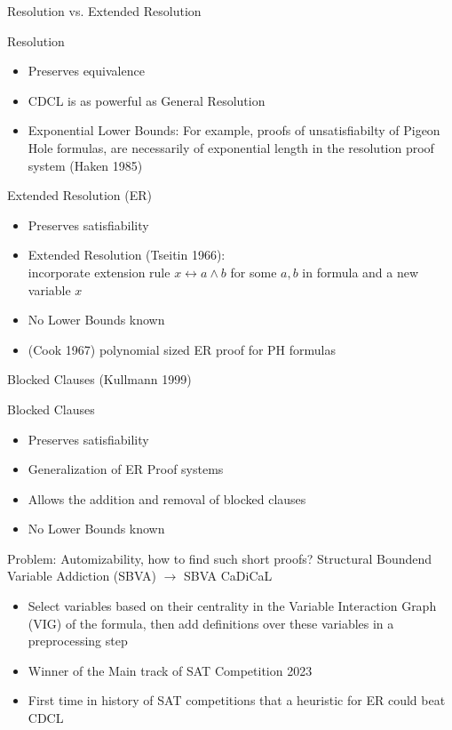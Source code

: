 \documentclass[t]{sdqbeamer}
\begin{document}
\begin{frame}{Resolution vs. Extended Resolution}
\begin{block}{Resolution}
\begin{itemize}\setlength{\itemsep}{1ex}
    \item Preserves equivalence
    \item CDCL is as powerful as General Resolution
    \item Exponential Lower Bounds: For example, proofs of unsatisfiabilty of Pigeon Hole formulas, are necessarily of exponential length in the resolution proof system (Haken 1985)
\end{itemize}
\end{block}
\begin{block}{Extended Resolution (ER)}
\begin{itemize}\setlength{\itemsep}{1ex}
    \item Preserves satisfiability
    \item Extended Resolution (Tseitin 1966):\\
    incorporate extension rule $x \leftrightarrow a \land b$ for some $a,b$ in formula and a new variable $x$
    \item No Lower Bounds known
    \item (Cook 1967) polynomial sized ER proof for PH formulas
\end{itemize}
\end{block}
\end{frame}


\begin{frame}{Blocked Clauses (Kullmann 1999)}
\begin{block}{Blocked Clauses}
\begin{itemize}\setlength{\itemsep}{1ex}
    \item Preserves satisfiability
    \item Generalization of ER Proof systems
    \item Allows the addition and removal of blocked clauses
    \item No Lower Bounds known
\end{itemize}
\end{block}
\pause
\begin{block}{Problem: Automizability, how to find such short proofs?}
Structural Boundend Variable Addiction (SBVA) $\rightarrow$ SBVA CaDiCaL
\begin{itemize}\setlength{\itemsep}{1ex}
    \item Select variables based on their centrality in the Variable Interaction Graph (VIG) of the formula, then add definitions over these variables in a preprocessing step
    \item Winner of the Main track of SAT Competition 2023
    \item First time in history of SAT competitions that a heuristic for ER could beat CDCL
\end{itemize}
\end{block}
\end{frame}
\end{document}
